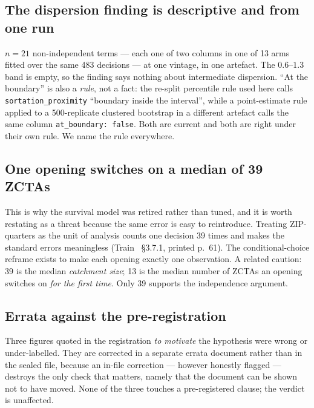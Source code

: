 \documentclass[conference]{IEEEtran}
\begin{document}
\subsection{The dispersion finding is descriptive and from one run}

$n=21$ non-independent terms --- each one of two columns in one of 13 arms
fitted over the same 483 decisions --- at one vintage, in one artefact. The
$0.6$--$1.3$ band is empty, so the finding says nothing about intermediate
dispersion. ``At the boundary'' is also a \emph{rule}, not a fact: the
re-split percentile rule used here calls \texttt{sortation\_proximity}
``boundary inside the interval'', while a point-estimate rule applied to a
500-replicate clustered bootstrap in a different artefact calls the same column
\texttt{at\_boundary: false}. Both are current and both are right under their
own rule. We name the rule everywhere.

\subsection{One opening switches on a median of 39 ZCTAs}

This is why the survival model was retired rather than tuned, and it is worth
restating as a threat because the same error is easy to reintroduce. Treating
ZIP-quarters as the unit of analysis counts one decision 39 times and makes the
standard errors meaningless (Train~\cite{train2009} \S3.7.1, printed p.~61).
The conditional-choice reframe exists to make each opening exactly one
observation. A related caution: 39 is the median \emph{catchment size}; 13 is
the median number of ZCTAs an opening switches on \emph{for the first time}.
Only 39 supports the independence argument.

\subsection{Errata against the pre-registration}

Three figures quoted in the registration \emph{to motivate} the hypothesis were
wrong or under-labelled. They are corrected in a separate errata document
rather than in the sealed file, because an in-file correction --- however
honestly flagged --- destroys the only check that matters, namely that the
document can be shown not to have moved. None of the three touches a
pre-registered clause; the verdict is unaffected.
\end{document}
